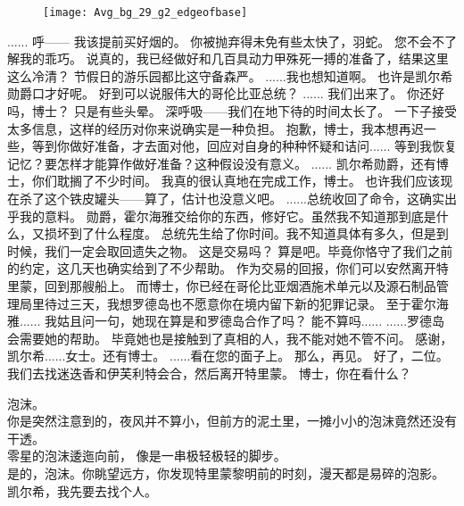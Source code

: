 \documentclass[openany]{book}
\begin{document}
\begin{figure}[h]
    \centering
    \texttt{[image: Avg\_bg\_29\_g2\_edgeofbase]}
\end{figure}
\begin{dialogue}
     ......
     呼——
     我该提前买好烟的。
     你被抛弃得未免有些太快了，羽蛇。
     您不会不了解我的乖巧。
     说真的，我已经做好和几百具动力甲殊死一搏的准备了，结果这里这么冷清？
     节假日的游乐园都比这守备森严。
     ......我也想知道啊。
     也许是凯尔希勋爵口才好呢。
     好到可以说服伟大的哥伦比亚总统？
     ......
     我们出来了。
     你还好吗，博士？
     只是有些头晕。
     深呼吸——我们在地下待的时间太长了。
     一下子接受太多信息，这样的经历对你来说确实是一种负担。
     抱歉，博士，我本想再迟一些，等到你做好准备，才去面对他，回应对自身的种种怀疑和诘问......
     等到我恢复记忆？要怎样才能算作做好准备？这种假设没有意义。
     ......
     凯尔希勋爵，还有博士，你们耽搁了不少时间。
     我真的很认真地在完成工作，博士。
     也许我们应该现在杀了这个铁皮罐头——算了，估计也没意义吧。
     ......总统收回了命令，这确实出乎我的意料。
     勋爵，霍尔海雅交给你的东西，修好它。虽然我不知道那到底是什么，又损坏到了什么程度。
     总统先生给了你时间。我不知道具体有多久，但是到时候，我们一定会取回遗失之物。
     这是交易吗？
     算是吧。毕竟你恪守了我们之前的约定，这几天也确实给到了不少帮助。
     作为交易的回报，你们可以安然离开特里蒙，回到那艘船上。
     而博士，你已经在哥伦比亚烟酒施术单元以及源石制品管理局里待过三天，我想罗德岛也不愿意你在境内留下新的犯罪记录。
     至于霍尔海雅......
     我姑且问一句，她现在算是和罗德岛合作了吗？
     能不算吗......
     ......罗德岛会需要她的帮助。
     毕竟她也是接触到了真相的人，我不能对她不管不问。
     感谢，凯尔希......女士。还有博士。
     ......看在您的面子上。
     那么，再见。
     好了，二位。
     我们去找迷迭香和伊芙利特会合，然后离开特里蒙。
     博士，你在看什么？\par
    泡沫。\\
    你是突然注意到的，夜风并不算小，但前方的泥土里，一摊小小的泡沫竟然还没有干透。\\
    零星的泡沫逶迤向前， 像是一串极轻极轻的脚步。\\
    是的，泡沫。你眺望远方，你发现特里蒙黎明前的时刻，漫天都是易碎的泡影。
     凯尔希，我先要去找个人。
\end{dialogue}\par
\end{document}
